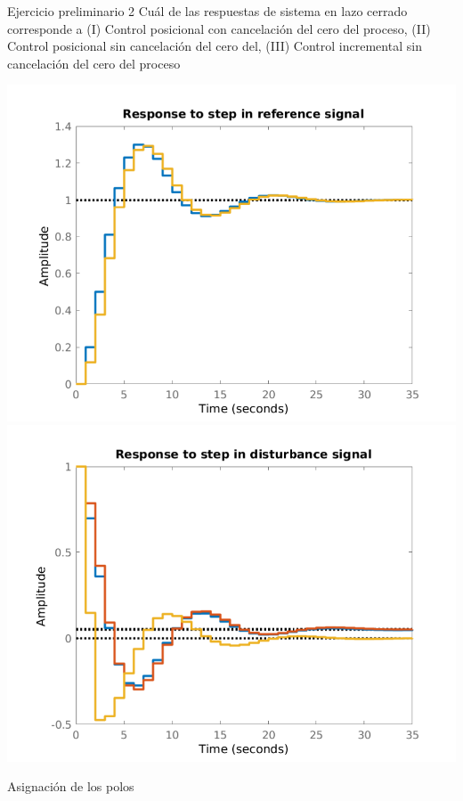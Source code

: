 \documentclass[presentation,aspectratio=169]{beamer}
\begin{document}
\begin{frame}[label={sec:org55312af}]{Ejercicio preliminario 2}
Cuál de las respuestas de sistema en lazo cerrado corresponde a (I) Control posicional \alert{con} cancelación del cero del proceso,  (II) Control posicional \alert{sin} cancelación del cero del, (III) Control \alert{incremental} sin cancelación del cero del proceso
\begin{center}
\includegraphics[width=0.45\linewidth]{../../figures/aw5_3_refstep}
\includegraphics[width=0.45\linewidth]{../../figures/aw5_3_diststep}
\end{center}
\end{frame}

\begin{frame}[label={sec:org0487dec}]{Asignación de los polos}
\end{frame}
\end{document}
